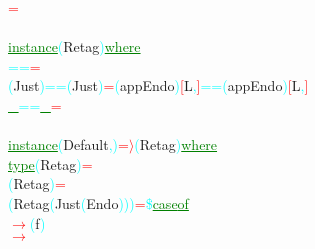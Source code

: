 \hsspace \textcolor{red}{=}\\\\\textcolor{green}{\underline{instance}}\hsspace \textcolor{cyan}{(}{\rm{}Retag}\textcolor{cyan}{)}\hsspace \textcolor{green}{\underline{where}}\\\hsspace \hsspace \textcolor{cyan}{==}\hsspace \hsspace \hsspace \textcolor{red}{=}\\\hsspace \textcolor{cyan}{(}{\rm{}Just}\textcolor{cyan}{)}\hsspace \textcolor{cyan}{==}\hsspace \textcolor{cyan}{(}{\rm{}Just}\textcolor{cyan}{)}\hsspace \textcolor{red}{=}\hsspace \textcolor{cyan}{(}{\rm{}appEndo}\textcolor{cyan}{)}\hsspace \textcolor{red}{[}{\rm{}L}\textcolor{cyan}{,}\textcolor{red}{]}\hsspace \textcolor{cyan}{==}\hsspace \textcolor{cyan}{(}{\rm{}appEndo}\textcolor{cyan}{)}\hsspace \textcolor{red}{[}{\rm{}L}\textcolor{cyan}{,}\textcolor{red}{]}\\\hstab \textcolor{green}{\underline{\_}}\hsspace \textcolor{cyan}{==}\hsspace \textcolor{green}{\underline{\_}}\hsspace \textcolor{red}{=}\\\\\textcolor{green}{\underline{instance}}\hsspace \textcolor{cyan}{(}{\rm{}Default}\textcolor{cyan}{,}\textcolor{cyan}{)}\hsspace \textcolor{red}{=\ensuremath{\rangle}}\hsspace \textcolor{cyan}{(}{\rm{}Retag}\textcolor{cyan}{)}\hsspace \textcolor{green}{\underline{where}}\\\hstab \textcolor{green}{\underline{type}}\hsspace \textcolor{cyan}{(}{\rm{}Retag}\textcolor{cyan}{)}\hsspace \textcolor{red}{=}\\\hsspace \textcolor{cyan}{(}{\rm{}Retag}\textcolor{cyan}{)}\hsspace \textcolor{red}{=}\\\hsspace \textcolor{cyan}{(}{\rm{}Retag}\hsspace \textcolor{cyan}{(}{\rm{}Just}\hsspace \textcolor{cyan}{(}{\rm{}Endo}\textcolor{cyan}{)}\textcolor{cyan}{)}\textcolor{cyan}{)}\hsspace \textcolor{red}{=}\hsspace \textcolor{cyan}{\$}\hsspace \textcolor{green}{\underline{case}}\hsspace \textcolor{green}{\underline{of}}\\\hstab {}\hsspace {}\hsspace \textcolor{red}{\ensuremath{\rightarrow}}\hsspace \textcolor{cyan}{(}{\rm{}f}\textcolor{cyan}{)}\\\hstab {}\hsspace \textcolor{red}{\ensuremath{\rightarrow}}\hsspace 